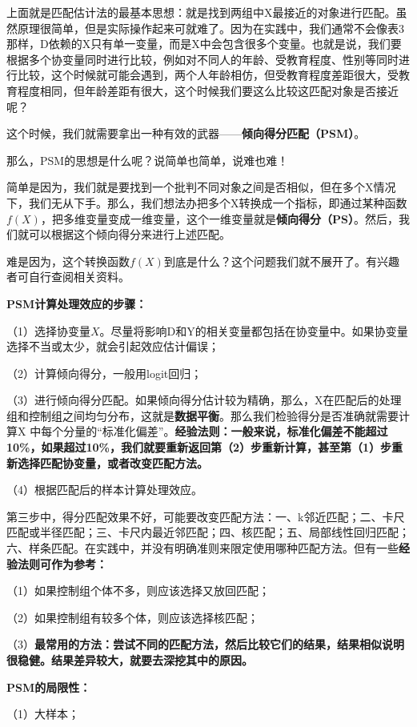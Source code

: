 \documentclass[cn,12pt,math=newtx,citestyle=gb7714-2015,bibstyle=gb7714-2015]{elegantbook}
\begin{document}
	上面就是匹配估计法的最基本思想：就是找到两组中X最接近的对象进行匹配。虽然原理很简单，但是实际操作起来可就难了。因为在实践中，我们通常不会像表3那样，D依赖的X只有单一变量，而是X中会包含很多个变量。也就是说，我们要根据多个协变量同时进行比较，例如对不同人的年龄、受教育程度、性别等同时进行比较，这个时候就可能会遇到，两个人年龄相仿，但受教育程度差距很大，受教育程度相同，但年龄差距有很大，这个时候我们要这么比较这匹配对象是否接近呢？
	
	这个时候，我们就需要拿出一种有效的武器——\textbf{倾向得分匹配（PSM）}。
	
	那么，PSM的思想是什么呢？说简单也简单，说难也难！
	
	简单是因为，我们就是要找到一个批判不同对象之间是否相似，但在多个X情况下，我们无从下手。那么，我们想法办把多个X转换成一个指标，即通过某种函数$f(X)$，把多维变量变成一维变量，这个一维变量就是\textbf{倾向得分（PS）}。然后，我们就可以根据这个倾向得分来进行上述匹配。
	
	难是因为，这个转换函数$f(X)$到底是什么？这个问题我们就不展开了。有兴趣者可自行查阅相关资料。
	
	\textbf{PSM计算处理效应的步骤：}
	
	（1）选择协变量$X$。尽量将影响D和Y的相关变量都包括在协变量中。如果协变量选择不当或太少，就会引起效应估计偏误；
	
	（2）计算倾向得分，一般用logit回归；
	
	（3）进行倾向得分匹配。如果倾向得分估计较为精确，那么，X在匹配后的处理组和控制组之间均匀分布，这就是\textbf{数据平衡}。那么我们检验得分是否准确就需要计算X 中每个分量的“标准化偏差”。\textbf{经验法则：一般来说，标准化偏差不能超过10\%，如果超过10\%，我们就要重新返回第（2）步重新计算，甚至第（1）步重新选择匹配协变量，或者改变匹配方法。}
	
	（4）根据匹配后的样本计算处理效应。
	
	第三步中，得分匹配效果不好，可能要改变匹配方法：一、k邻近匹配；二、卡尺匹配或半径匹配；三、卡尺内最近邻匹配；四、核匹配；五、局部线性回归匹配；六、样条匹配。在实践中，并没有明确准则来限定使用哪种匹配方法。但有一些\textbf{经验法则可作为参考：}
	
	（1）如果控制组个体不多，则应该选择又放回匹配；
	
	（2）如果控制组有较多个体，则应该选择核匹配；
	
	（3）\textbf{最常用的方法：尝试不同的匹配方法，然后比较它们的结果，结果相似说明很稳健。结果差异较大，就要去深挖其中的原因。}
	
	\textbf{PSM的局限性：}
	
	（1）大样本；
	
\end{document}
